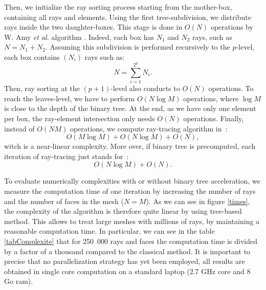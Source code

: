 \documentclass{aes2e}
\begin{document}
Then, we initialize the ray sorting process starting from the mother-box, containing all rays and elements. Using the first tree-subdivision, we distribute rays inside the two daughter-boxes. This stage is done in $O(N)$ operations by W. Amy \textit{et al.} algorithm \cite{AABB}. Indeed, each box has $N_1$ and $N_2$ rays, such as $N = N_1 + N_2$. Assuming this subdivision is performed recursively to the $p$-level, each box contains $(N_i)$ rays such as: 
\begin{equation}
N = \sum_{i=1}^{2^p} N_i.
\end{equation}  
Then, ray sorting at the $(p+1)$-level also conducts to $O(N)$ operations. To reach the leaves-level, we have to perform $O(N \log M)$ operations, where $\log M$ is close to the depth of the binary tree. At the end, as we have only one element per box, the ray-element intersection only needs $O(N)$ operations. Finally, instead of $O(N M)$ operations, we compute ray-tracing algorithm in~: 
\begin{equation}
O(M\log M) + O(N \log M) + O(N),
\end{equation}  
witch is a near-linear complexity. More over, if binary tree is precomputed, each iteration of ray-tracing just stands for~:
\begin{equation}
O(N \log M) + O(N).
\end{equation}
 
To evaluate numerically complexities with or without binary tree acceleration, we measure the computation time of one iteration by increasing the number of rays and the number of faces in the mesh ($N=M$). As we can see in figure \ref{times}, the complexity of the algorithm is therefore quite linear by using tree-based method. This allows to treat large meshes with millions of rays, by maintaining a reasonable computation time. In particular, we can see in the table \ref{tabComplexite} that for 250~000 rays and faces the computation time is divided by a factor of a thousand compared to the classical method. It is important to precise that no parallelization strategy has yet been employed, all results are obtained in single core computation on a standard laptop (2.7 GHz core and 8 Go ram).
\end{document}
